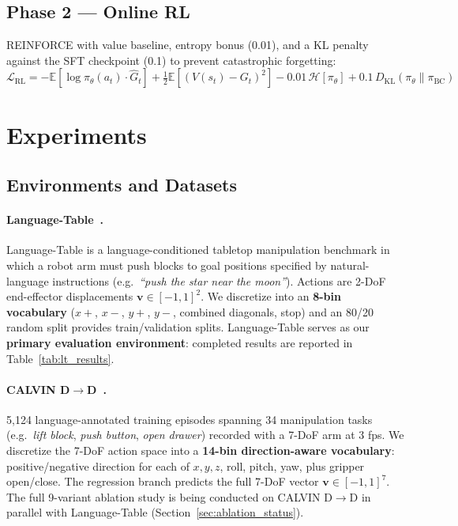 \documentclass{article}
\begin{document}
\subsection{Phase 2 — Online RL}
REINFORCE with value baseline, entropy bonus (0.01), and a KL penalty
against the SFT checkpoint (0.1) to prevent catastrophic forgetting:
\begin{equation}
  \mathcal{L}_{\mathrm{RL}}
  = -\mathbb{E}[\log\pi_\theta(a_t)\cdot\hat{G}_t]
  + \tfrac{1}{2}\mathbb{E}[(V(s_t){-}G_t)^2]
  - 0.01\,\mathcal{H}[\pi_\theta]
  + 0.1\,D_{\mathrm{KL}}(\pi_\theta\|\pi_{\mathrm{BC}})
\end{equation}

\section{Experiments}
\label{sec:experiments}

\subsection{Environments and Datasets}

\paragraph{Language-Table~\citep{lynch2023languagetable}.}
Language-Table is a language-conditioned tabletop manipulation benchmark
in which a robot arm must push blocks to goal positions specified by
natural-language instructions (e.g.\ \textit{``push the star near the moon''}).
Actions are 2-DoF end-effector displacements $\mathbf{v}\!\in\![-1,1]^2$.
We discretize into an \textbf{8-bin vocabulary}
($x{+}$, $x{-}$, $y{+}$, $y{-}$, combined diagonals, stop)
and an 80/20 random split provides train/validation splits.
Language-Table serves as our \textbf{primary evaluation environment}:
completed results are reported in Table~\ref{tab:lt_results}.

\paragraph{CALVIN D$\to$D~\citep{mees2022calvin}.}
5,124 language-annotated training episodes spanning 34 manipulation tasks
(e.g.\ \textit{lift block}, \textit{push button}, \textit{open drawer})
recorded with a 7-DoF arm at 3 fps.
We discretize the 7-DoF action space into a \textbf{14-bin direction-aware
vocabulary}: positive/negative direction for each of $x, y, z$, roll, pitch, yaw,
plus gripper open/close.
The regression branch predicts the full 7-DoF vector
$\mathbf{v}\!\in\![-1,1]^7$.
The full 9-variant ablation study is being conducted on CALVIN D$\to$D
in parallel with Language-Table (Section~\ref{sec:ablation_status}).
\end{document}
